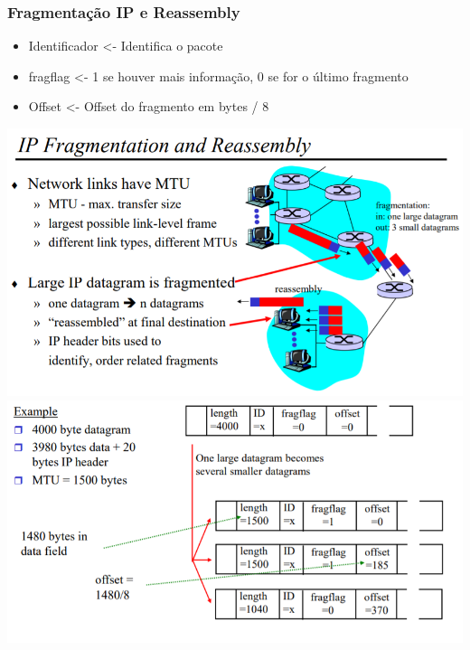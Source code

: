 \documentclass[../resumosRCOM.tex]{subfiles}
\begin{document}
\subsubsection{Fragmentação IP e Reassembly}
\begin{itemize}
    \item Identificador <- Identifica o pacote
    \item fragflag <- 1 se houver mais informação, 0 se for o último fragmento
	\item Offset <- Offset do fragmento em bytes / 8
\end{itemize}
\begin{center}
    \includegraphics[width=14cm]{images/RCOM14.png}
    \includegraphics[width=14cm]{images/RCOM15.png}
\end{center}
\end{document}
